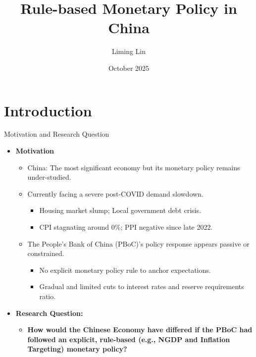 \documentclass{beamer}
\title{Rule-based Monetary Policy in China}
\author{Liming Lin}
\institute{Sciences Po Paris}
\date{October 2025}
\begin{document}
\begin{frame}
  \titlepage
\end{frame}



\section{Introduction}

\begin{frame}{Motivation and Research Question}
  \begin{itemize}
    \item \textbf{Motivation}
    \begin{itemize}
     \item China: The most significant economy but its monetary policy remains under-studied.
     \item Currently facing a severe post-COVID demand slowdown.
     \begin{itemize}  
        \item Housing market slump; Local government debt crisis.
        \item CPI stagnating around 0\%; PPI negative since late 2022.
     \end{itemize}
     \item The People's Bank of China (PBoC)'s policy response appears passive or constrained.
      \begin{itemize}  
        \item No explicit monetary policy rule to anchor expectations.
        \item Gradual and limited cuts to interest rates and reserve requirements ratio.
     \end{itemize}
    \end{itemize}
    \item \textbf{Research Question:}
    \begin{itemize}
        \item \textbf{How would the Chinese Economy have differed if the PBoC had followed an explicit, rule-based (e.g., NGDP and Inflation Targeting) monetary policy?}
    \end{itemize}
  \end{itemize}
  
\end{frame}


\end{document}
